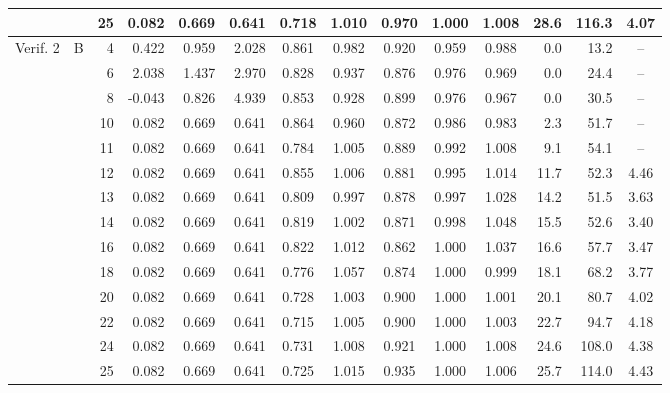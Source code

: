 \begin{table}[htbp]
\begin{adjustbox}{max width=\textwidth}
\begin{tabular}{@{}llr*{3}{r}*{5}{c}rrc@{}}
         &  & 25 & 0.082 & 0.669 & 0.641 & 0.718 & 1.010 & 0.970 & 1.000 & 1.008 & 28.6 & 116.3 & 4.07 \\
        \midrule
        Verif. 2 & B & 4 & 0.422 & 0.959 & 2.028 & 0.861 & 0.982 & 0.920 & 0.959 & 0.988 & 0.0 & 13.2 & -- \\
         &  & 6 & 2.038 & 1.437 & 2.970 & 0.828 & 0.937 & 0.876 & 0.976 & 0.969 & 0.0 & 24.4 & -- \\
         &  & 8 & -0.043 & 0.826 & 4.939 & 0.853 & 0.928 & 0.899 & 0.976 & 0.967 & 0.0 & 30.5 & -- \\
         &  & 10 & 0.082 & 0.669 & 0.641 & 0.864 & 0.960 & 0.872 & 0.986 & 0.983 & 2.3 & 51.7 & -- \\
         &  & 11 & 0.082 & 0.669 & 0.641 & 0.784 & 1.005 & 0.889 & 0.992 & 1.008 & 9.1 & 54.1 & -- \\
         &  & 12 & 0.082 & 0.669 & 0.641 & 0.855 & 1.006 & 0.881 & 0.995 & 1.014 & 11.7 & 52.3 & 4.46 \\
         &  & 13 & 0.082 & 0.669 & 0.641 & 0.809 & 0.997 & 0.878 & 0.997 & 1.028 & 14.2 & 51.5 & 3.63 \\
         &  & 14 & 0.082 & 0.669 & 0.641 & 0.819 & 1.002 & 0.871 & 0.998 & 1.048 & 15.5 & 52.6 & 3.40 \\
         &  & 16 & 0.082 & 0.669 & 0.641 & 0.822 & 1.012 & 0.862 & 1.000 & 1.037 & 16.6 & 57.7 & 3.47 \\
         &  & 18 & 0.082 & 0.669 & 0.641 & 0.776 & 1.057 & 0.874 & 1.000 & 0.999 & 18.1 & 68.2 & 3.77 \\
         &  & 20 & 0.082 & 0.669 & 0.641 & 0.728 & 1.003 & 0.900 & 1.000 & 1.001 & 20.1 & 80.7 & 4.02 \\
         &  & 22 & 0.082 & 0.669 & 0.641 & 0.715 & 1.005 & 0.900 & 1.000 & 1.003 & 22.7 & 94.7 & 4.18 \\
         &  & 24 & 0.082 & 0.669 & 0.641 & 0.731 & 1.008 & 0.921 & 1.000 & 1.008 & 24.6 & 108.0 & 4.38 \\
         &  & 25 & 0.082 & 0.669 & 0.641 & 0.725 & 1.015 & 0.935 & 1.000 & 1.006 & 25.7 & 114.0 & 4.43 \\
        \bottomrule
    \end{tabular}
    \end{adjustbox}
\end{table}
